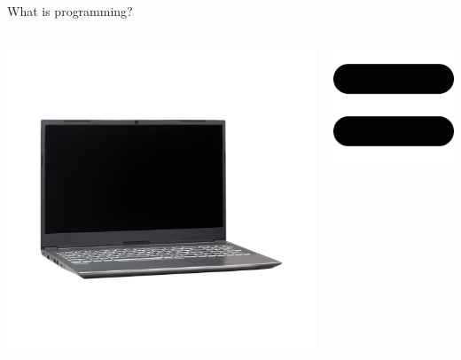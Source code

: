 \documentclass[11pt]{beamer}
\begin{document}
\begin{frame}{What is programming?}
  \begin{columns}
      \includegraphics[scale=0.12]{img/laptop.png}
      \begin{center}\includegraphics[scale=0.12]{img/equal.png}\end{center}

\end{columns}
\end{frame}
\end{document}
